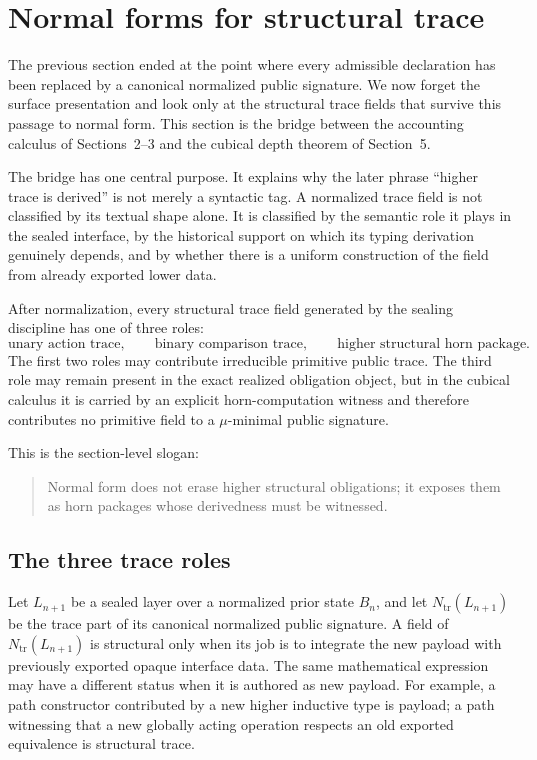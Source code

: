 \documentclass{lmcs}
\begin{document}
\section{Normal forms for structural trace}

The previous section ended at the point where every admissible declaration has been replaced
by a canonical normalized public signature.  We now forget the surface presentation and look
only at the structural trace fields that survive this passage to normal form.  This section is
the bridge between the accounting calculus of Sections~2--3 and the cubical depth theorem of
Section~5.

The bridge has one central purpose.  It explains why the later phrase ``higher trace is
derived'' is not merely a syntactic tag.  A normalized trace field is not classified by its
textual shape alone.  It is classified by the semantic role it plays in the sealed interface,
by the historical support on which its typing derivation genuinely depends, and by whether
there is a uniform construction of the field from already exported lower data.

After normalization, every structural trace field generated by the sealing discipline has one
of three roles:
\[
  \text{unary action trace},
  \qquad
  \text{binary comparison trace},
  \qquad
  \text{higher structural horn package}.
\]
The first two roles may contribute irreducible primitive public trace.  The third role may
remain present in the exact realized obligation object, but in the cubical calculus it is
carried by an explicit horn-computation witness and therefore contributes no primitive field
to a \(\mu\)-minimal public signature.

This is the section-level slogan:
\begin{quote}
Normal form does not erase higher structural obligations; it exposes them as horn packages
whose derivedness must be witnessed.
\end{quote}

\subsection{The three trace roles}

Let \(L_{n+1}\) be a sealed layer over a normalized prior state \(B_n\), and let
\(N_{\mathrm{tr}}(L_{n+1})\) be the trace part of its canonical normalized public signature.
A field of \(N_{\mathrm{tr}}(L_{n+1})\) is structural only when its job is to integrate the new
payload with previously exported opaque interface data.  The same mathematical expression
may have a different status when it is authored as new payload.  For example, a path
constructor contributed by a new higher inductive type is payload; a path witnessing that a
new globally acting operation respects an old exported equivalence is structural trace.
\end{document}

